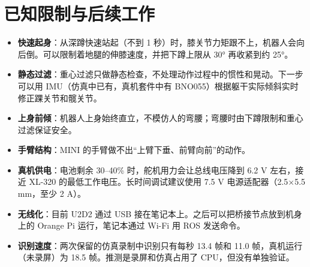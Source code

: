 \documentclass[11pt,a4paper]{article}
\begin{document}
\section{已知限制与后续工作}
\label{sec:limits}
\begin{itemize}
  \item \textbf{快速起身}：从深蹲快速站起（不到 1 秒）时，膝关节力矩跟不上，机器人会向后倒。可以限制着地腿的伸膝速度，并把下蹲上限从 30° 再收紧到约 25°。
  \item \textbf{静态过滤}：重心过滤只做静态检查，不处理动作过程中的惯性和晃动。下一步可以用 IMU（仿真中已有，真机套件中有 BNO055）根据躯干实际倾斜实时修正踝关节和髋关节。
  \item \textbf{上身前倾}：机器人上身始终直立，不模仿人的弯腰；弯腰时由下蹲限制和重心过滤保证安全。
  \item \textbf{手臂结构}：MINI 的手臂做不出“上臂下垂、前臂向前”的动作。
  \item \textbf{真机供电}：电池剩余 30–40\% 时，舵机用力会让总线电压降到 6.2 V 左右，接近 XL-320 的最低工作电压。长时间调试建议使用 7.5 V 电源适配器（2.5$\times$5.5 mm，至少 2 A）。
  \item \textbf{无线化}：目前 U2D2 通过 USB 接在笔记本上。之后可以把桥接节点放到机身上的 Orange Pi 运行，笔记本通过 Wi-Fi 用 ROS 发送命令。
  \item \textbf{识别速度}：两次保留的仿真录制中识别只有每秒 13.4 帧和 11.0 帧，真机运行（未录屏）为 18.5 帧。推测是录屏和仿真占用了 CPU，但没有单独验证。
\end{itemize}

\end{document}
